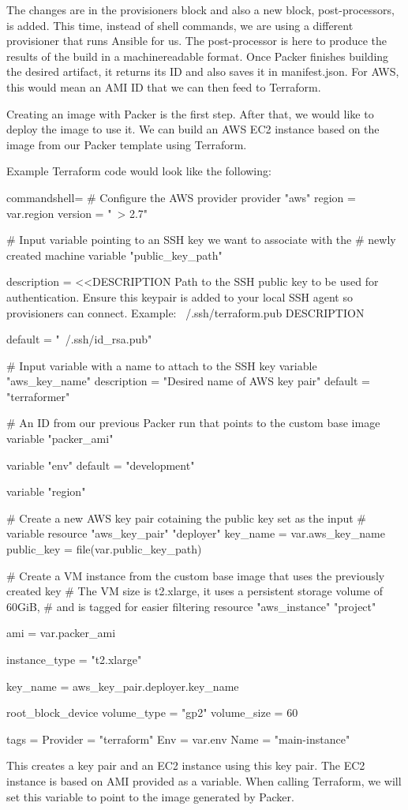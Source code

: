 The changes are in the provisioners block and also a new block, post-processors, is added. This time, instead of shell commands, we are using a different provisioner that runs Ansible for us. The post-processor is here to produce the results of the build in a machinereadable format. Once Packer finishes building the desired artifact, it returns its ID and also saves it in manifest.json. For AWS, this would mean an AMI ID that we can then feed to Terraform.


Creating an image with Packer is the first step. After that, we would like to deploy the image to use it. We can build an AWS EC2 instance based on the image from our Packer template using Terraform.

Example Terraform code would look like the following:

\begin{tcblisting}{commandshell={}}
# Configure the AWS provider
provider "aws" {
  region = var.region
  version = "~> 2.7"
}

# Input variable pointing to an SSH key we want to associate with the
# newly created machine
variable "public_key_path" {
  description = <<DESCRIPTION
Path to the SSH public key to be used for authentication. Ensure this keypair is added to your local SSH agent so provisioners can connect.
Example: ~/.ssh/terraform.pub
DESCRIPTION

  default = "~/.ssh/id_rsa.pub"
}

# Input variable with a name to attach to the SSH key
variable "aws_key_name" {
  description = "Desired name of AWS key pair"
  default = "terraformer"
}

# An ID from our previous Packer run that points to the custom base image
variable "packer_ami" {
}

variable "env" {
  default = "development"
}

variable "region" {
}

# Create a new AWS key pair cotaining the public key set as the input
# variable
resource "aws_key_pair" "deployer" {
  key_name = var.aws_key_name
  public_key = file(var.public_key_path)
}

# Create a VM instance from the custom base image that uses the previously created key
# The VM size is t2.xlarge, it uses a persistent storage volume of 60GiB,
# and is tagged for easier filtering
resource "aws_instance" "project" {
  ami = var.packer_ami
  
  instance_type = "t2.xlarge"
  
  key_name = aws_key_pair.deployer.key_name
  
  root_block_device {
    volume_type = "gp2"
    volume_size = 60
  }

  tags = {
    Provider = "terraform"
    Env = var.env
    Name = "main-instance"
  }
}
\end{tcblisting}

This creates a key pair and an EC2 instance using this key pair. The EC2 instance is based on AMI provided as a variable. When calling Terraform, we will set this variable to point to the image generated by Packer.



